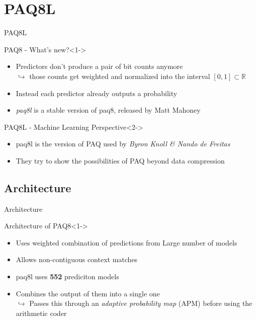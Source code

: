 \documentclass[11pt,usenames,dvipsnames]{beamer}
\begin{document}
\section{PAQ8L}
\begin{frame}{PAQ8L}
	\begin{exampleblock}{PAQ8 - What's new?}<1->
		\begin{itemize}
			\item Predictors don't produce a pair of bit counts anymore\\
			$\hookrightarrow$ those counts get weighted and normalized into the interval $[0,1]\subset\mathbb{R}$
			\item Instead  each predictor already outputs a probability
			\item \textit{paq8l} is a stable version of paq8, released by Matt Mahoney
		\end{itemize}
	\end{exampleblock}
	
		\begin{alertblock}{PAQ8L - Machine Learning Perspective}<2->
		\begin{itemize}
			\item paq8l is the version of PAQ used by \textit{Byron Knoll \& Nando de Freitas}
			\item They try to show the possibilities of PAQ beyond data compression
		\end{itemize}
	\end{alertblock}
\end{frame}

\subsection{Architecture}
\begin{frame}{Architecture}


	\begin{exampleblock}{Architecture of PAQ8}<1->
		\begin{itemize}
			\item Uses weighted combination of predictions from Large number of models
			\item Allows non-contiguous context matches
			\item paq8l uses \textbf{552} prediciton models
			\item Combines the output of them into a single one\\
			$\hookrightarrow$ Passes this through an \textit{adaptive probability map} (APM) before using the arithmetic coder
		\end{itemize}
	\end{exampleblock}
	\hfill
	

	

\end{frame}
\end{document}
